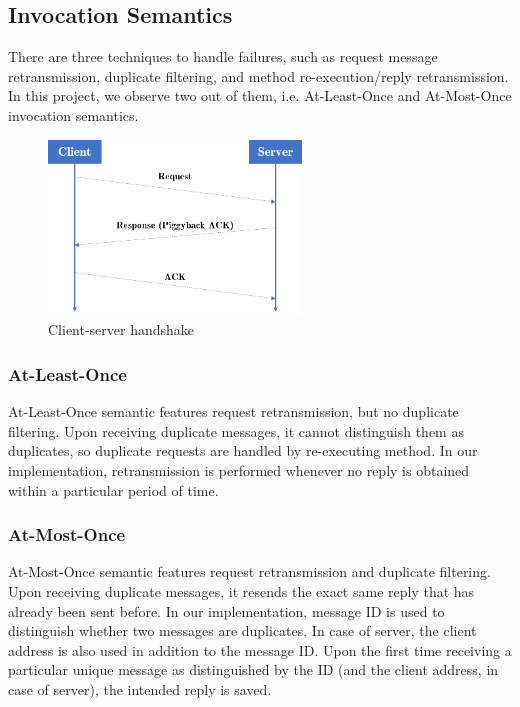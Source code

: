 \documentclass[12pt]{article}
\begin{document}
\subsection{Invocation Semantics}
There are three techniques to handle failures, such as request message retransmission, duplicate filtering, and method re-execution/reply retransmission. In this project, we observe two out of them, i.e. At-Least-Once and At-Most-Once invocation semantics.

\begin{figure}[htbp!]
    \centering
    \includegraphics[width=0.6\textwidth]{handshake.png}
    \caption[Client-Server Handshake]{Client-server handshake}
    \label{fig:handshake}
\end{figure}


\subsubsection{At-Least-Once}
At-Least-Once semantic features request retransmission, but no duplicate filtering. Upon receiving duplicate messages, it cannot distinguish them as duplicates, so duplicate requests are handled by re-executing method. In our implementation, retransmission is performed whenever no reply is obtained within a particular period of time.

\subsubsection{At-Most-Once}
At-Most-Once semantic features request retransmission and duplicate filtering. Upon receiving duplicate messages, it resends the exact same reply that has already been sent before. In our implementation, message ID is used to distinguish whether two messages are duplicates. In case of server, the client address is also used in addition to the message ID. Upon the first time receiving a particular unique message as distinguished by the ID (and the client address, in case of server), the intended reply is saved.
\end{document}

